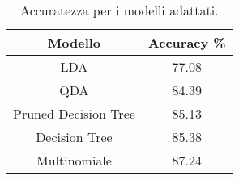 \begin{table}[H]
\centering\caption{Accuratezza per i modelli adattati.}
\begin{tabular}{cc}
\toprule
              Modello &  Accuracy \% \\
\midrule
                  LDA &       77.08 \\
                  QDA &       84.39 \\
 Pruned Decision Tree &       85.13 \\
        Decision Tree &       85.38 \\
         Multinomiale &       87.24 \\
\bottomrule
\end{tabular}
\end{table}